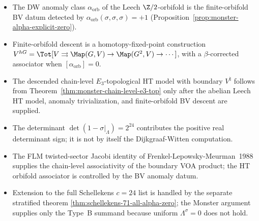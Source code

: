 \begin{itemize}
\item The DW anomaly class $\alpha_{\mathrm{orb}}$ of the Leech
$\Z/2$-orbifold is the finite-orbifold BV datum detected by
$\alpha_{\mathrm{orb}}(\sigma,\sigma,\sigma)=+1$
(Proposition~\ref{prop:monster-alpha-explicit-zero}).
\item Finite-orbifold descent is a homotopy-fixed-point construction
$V^{hG}=\Tot[V\rightrightarrows\Map(G,V)\to\Map(G^2,V)\to\cdots]$,
with a $\beta$-corrected associator when
$[\alpha_{\mathrm{orb}}]=0$.
\item The descended chain-level $E_3$-topological HT model with
boundary $V^\natural$ follows from
Theorem~\ref{thm:monster-chain-level-e3-top} only after the abelian
Leech HT model, anomaly trivialization, and finite-orbifold BV descent
are supplied.
\item The determinant $\det(1-\sigma|_\Lambda)=2^{24}$ contributes
the positive real determinant sign; it is not by itself the
Dijkgraaf-Witten computation.
\item The FLM twisted-sector Jacobi identity of
Frenkel-Lepowsky-Meurman~1988 supplies the chain-level associativity
of the boundary VOA product; the HT orbifold associator is controlled
by the BV anomaly datum.
\item Extension to the full Schellekens $c = 24$ list is handled by
the separate stratified theorem
\ref{thm:schellekens-71-all-alpha-zero}; the Monster argument supplies
only the Type~B summand because uniform $\Lambda^\sigma = 0$ does not
hold.
\end{itemize}
